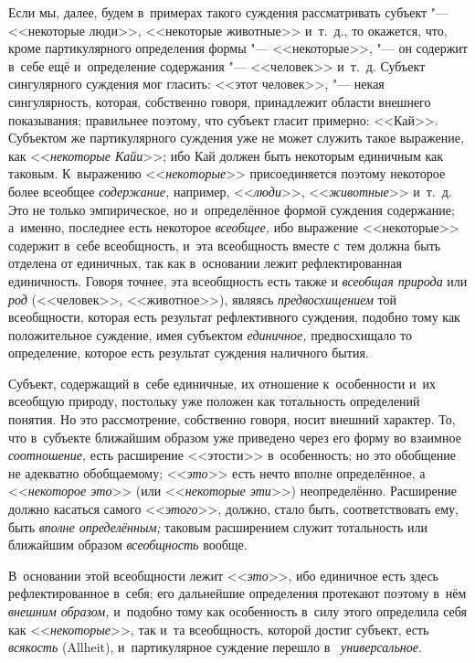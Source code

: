 Если мы, далее, будем в~примерах такого суждения рассматривать субъект "---
<<некоторые люди>>, <<некоторые животные>> и~т.~д., то окажется, что, кроме
партикулярного определения формы "--- <<некоторые>>, "--- он содержит в~себе
ещё и~определение содержания "--- <<человек>> и~т.~д. Субъект сингулярного
суждения мог гласить: <<этот человек>>, "--- некая сингулярность, которая,
собственно говоря, принадлежит области внешнего показывания; правильнее
поэтому, что субъект гласит примерно: <<Кай>>. Субъектом же партикулярного
суждения уже не может служить такое выражение, как <<{\em некоторые Кайи}>>;
ибо Кай должен быть некоторым единичным как таковым. К~выражению
<<{\em некоторые}>> присоединяется поэтому некоторое более всеобщее
{\em содержание,} например, <<{\em люди}>>, <<{\em животные}>> и~т.~д. Это
не только эмпирическое, но и~определённое формой суждения содержание; а~именно,
последнее есть некоторое {\em всеобщее,} ибо выражение <<некоторые>> содержит
в~себе всеобщность, и~эта всеобщность вместе с~тем должна быть отделена от
единичных, так как в~основании лежит рефлектированная единичность. Говоря
точнее, эта всеобщность есть также и {\em всеобщая природа} или {\em род}
(<<человек>>, <<животное>>), являясь {\em предвосхищением} той всеобщности,
которая есть результат рефлективного суждения, подобно тому как положительное
суждение, имея субъектом {\em единичное,} предвосхищало то определение, которое
есть результат суждения наличного бытия.

Субъект, содержащий в~себе единичные, их отношение к~особенности и~их всеобщую
природу, постольку уже положен как тотальность определений понятия. Но это
рассмотрение, собственно говоря, носит внешний характер. То, что в~субъекте
ближайшим образом уже приведено через его форму во взаимное {\em соотношение,}
есть расширение <<этости>> в~особенность; но это обобщение не адекватно
обобщаемому; <<{\em это}>> есть нечто вполне определённое, а <<{\em некоторое
это}>> (или <<{\em некоторые эти}>>) неопределённо. Расширение должно касаться
самого <<{\em этого}>>, должно, стало быть, соответствовать ему, быть
{\em вполне определённым;} таковым расширением служит тотальность или
ближайшим образом {\em всеобщность} вообще.

В~основании этой всеобщности лежит <<{\em это}>>, ибо единичное есть здесь
рефлектированное в~себя; его дальнейшие определения протекают поэтому в~нём
{\em внешним образом,} и~подобно тому как особенность в~силу этого определила
себя как <<{\em некоторые}>>, так и~та всеобщность, которой достиг субъект,
есть {\em всякость} (Allheit), и~партикулярное суждение перешло в~{\em
универсальное}.

